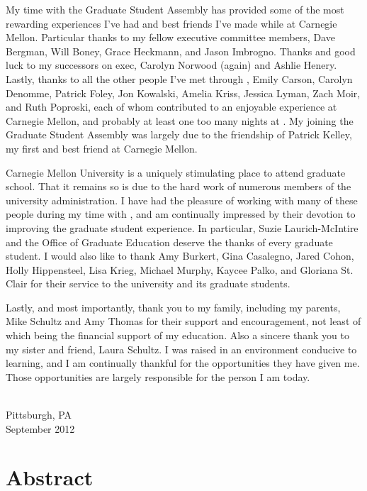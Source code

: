 \documentclass[12pt,%
              twoside,
               letterpaper]{uiothesis}
\begin{document}
My time with the Graduate Student Assembly has provided some of the most rewarding
experiences I've had and best friends I've made while at Carnegie Mellon. Particular
thanks to my fellow  executive committee members, Dave Bergman, Will Boney,
Grace Heckmann, and Jason Imbrogno. Thanks and good luck to my successors on 
exec, Carolyn Norwood (again) and Ashlie Henery. Lastly, thanks to all the other people
I've met through , Emily Carson, Carolyn Denomme, Patrick Foley, Jon Kowalski,
Amelia Kriss, Jessica Lyman, Zach Moir, and Ruth Poproski, each of whom contributed to an
enjoyable experience at Carnegie Mellon, and probably at least one too many nights at
. My joining the Graduate Student Assembly was largely due to the friendship of
Patrick Kelley, my first and best friend at Carnegie Mellon. 

Carnegie Mellon University is a uniquely stimulating place to attend graduate school. That
it remains so is due to the hard work of numerous members of the university
administration. I have had the pleasure of working with many of these people during my
time with , and am continually impressed by their devotion to improving the
graduate student experience. In particular, Suzie Laurich-McIntire and the Office of
Graduate Education deserve the thanks of every graduate student. I would also like to
thank Amy Burkert, Gina Casalegno, Jared Cohon, Holly Hippensteel, Lisa Krieg, Michael
Murphy, Kaycee Palko, and Gloriana St. Clair for their service to the university and its
graduate students.

Lastly, and most importantly, thank you to my family, including my parents, Mike Schultz
and Amy Thomas for their support and encouragement, not least of which being the financial
support of my education. Also a sincere thank you to my sister and friend, Laura Schultz.
I was raised in an environment conducive to learning, and I am continually thankful for
the opportunities they have given me. Those opportunities are largely responsible for the
person I am today.


{ \\ Pittsburgh, PA \\ September 2012\par}

\chapter{Abstract}
\end{document}
